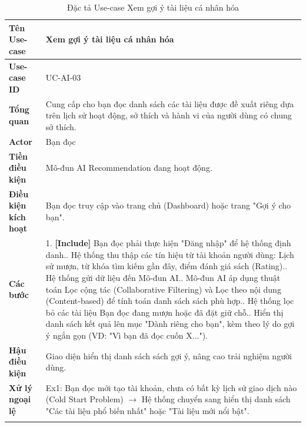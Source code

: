 \newpage
\begin{longtable}{|p{3.5cm}|p{11.5cm}|}
    \hline
    \textbf{Tên Use-case} & \textbf{Xem gợi ý tài liệu cá nhân hóa} \\
    \hline
    \textbf{Use-case ID} & UC-AI-03 \\
    \hline
    \textbf{Tổng quan} & Cung cấp cho bạn đọc danh sách các tài liệu được đề xuất riêng dựa trên lịch sử hoạt động, sở thích và hành vi của người dùng có chung sở thích. \\
    \hline
    \textbf{Actor} & Bạn đọc \\
    \hline
    \textbf{Tiền điều kiện} & Mô-đun AI Recommendation đang hoạt động. \\
    \hline
    \textbf{Điều kiện kích hoạt} & Bạn đọc truy cập vào trang chủ (Dashboard) hoặc trang "Gợi ý cho bạn". \\
    \hline
    \textbf{Các bước} & 
    1. \textbf{[Include]} Bạn đọc phải thực hiện "Đăng nhập" để hệ thống định danh.\newline
    2. Hệ thống thu thập các tín hiệu từ tài khoản người dùng: Lịch sử mượn, từ khóa tìm kiếm gần đây, điểm đánh giá sách (Rating).\newline
    3. Hệ thống gửi dữ liệu đến Mô-đun AI.\newline
    4. Mô-đun AI áp dụng thuật toán Lọc cộng tác (Collaborative Filtering) và Lọc theo nội dung (Content-based) để tính toán danh sách sách phù hợp.\newline
    5. Hệ thống lọc bỏ các tài liệu Bạn đọc đang mượn hoặc đã đặt giữ chỗ.\newline
    6. Hiển thị danh sách kết quả lên mục "Dành riêng cho bạn", kèm theo lý do gợi ý ngắn gọn (VD: "Vì bạn đã đọc cuốn X..."). \\
    \hline
    \textbf{Hậu điều kiện} & Giao diện hiển thị danh sách sách gợi ý, nâng cao trải nghiệm người dùng. \\
    \hline
    \textbf{Xử lý ngoại lệ} & 
    Ex1: Bạn đọc mới tạo tài khoản, chưa có bất kỳ lịch sử giao dịch nào (Cold Start Problem) $\rightarrow$ Hệ thống chuyển sang hiển thị danh sách "Các tài liệu phổ biến nhất" hoặc "Tài liệu mới nổi bật". \\
    \hline
    \caption{Đặc tả Use-case Xem gợi ý tài liệu cá nhân hóa}
\end{longtable}


